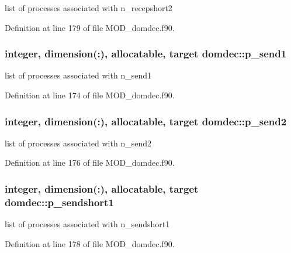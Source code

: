 list of processes associated with n\-\_\-recepshort2 



Definition at line 179 of file M\-O\-D\-\_\-domdec.\-f90.

\hypertarget{classdomdec_a1d393373b27051c32983ecf341da6163}{
\subsubsection[{p\-\_\-send1}]{\setlength{\rightskip}{0pt plus 5cm}integer, dimension(\-:), allocatable, target domdec\-::p\-\_\-send1}}\label{classdomdec_a1d393373b27051c32983ecf341da6163}


list of processes associated with n\-\_\-send1 



Definition at line 174 of file M\-O\-D\-\_\-domdec.\-f90.

\hypertarget{classdomdec_a8323226a166ccbe0958fcb23e40e8ea3}{
\subsubsection[{p\-\_\-send2}]{\setlength{\rightskip}{0pt plus 5cm}integer, dimension(\-:), allocatable, target domdec\-::p\-\_\-send2}}\label{classdomdec_a8323226a166ccbe0958fcb23e40e8ea3}


list of processes associated with n\-\_\-send2 



Definition at line 176 of file M\-O\-D\-\_\-domdec.\-f90.

\hypertarget{classdomdec_a1160480c1dedc45c50370302ac8df4cb}{
\subsubsection[{p\-\_\-sendshort1}]{\setlength{\rightskip}{0pt plus 5cm}integer, dimension(\-:), allocatable, target domdec\-::p\-\_\-sendshort1}}\label{classdomdec_a1160480c1dedc45c50370302ac8df4cb}


list of processes associated with n\-\_\-sendshort1 



Definition at line 178 of file M\-O\-D\-\_\-domdec.\-f90.

